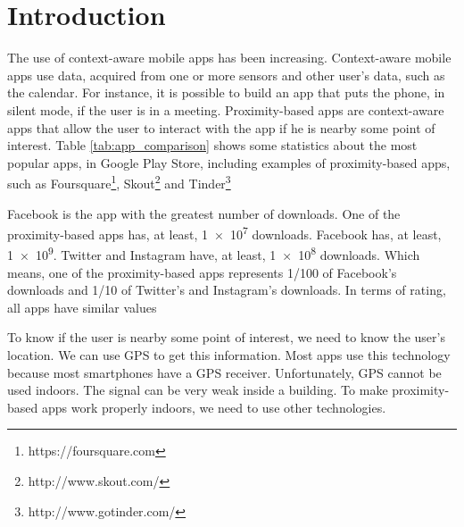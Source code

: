 
%
%

\section{Introduction}
\label{sec:introduction}


The use of context-aware mobile apps has been increasing.
Context-aware mobile apps use data, acquired
from one or more sensors and other user's data, 
such as the calendar. For instance, it is possible to
build an app that puts the phone, in silent mode, if the
user is in a meeting. Proximity-based apps are
context-aware apps that allow the user to interact
with the app if he is nearby some point of interest.
Table \ref{tab:app_comparison} shows some statistics
about the most popular apps, in Google Play Store,
including examples of proximity-based apps,
such as Foursquare\footnote{https://foursquare.com},
Skout\footnote{http://www.skout.com/} and
Tinder\footnote{http://www.gotinder.com/}



Facebook is the app with the
greatest number of downloads. One of the 
proximity-based apps has, at least, \num{1e7} downloads.
Facebook has, at least, \num{1e9}. Twitter and Instagram
have, at least, \num{1e8} downloads. Which means, one of
the proximity-based apps represents
1/100 of Facebook's downloads and 1/10 of Twitter's
and Instagram's downloads. In terms of rating, all apps
have similar values

To know if the user is nearby some point of interest,
we need to know the user's location. We can use GPS to
get this information. Most apps use this technology because
most smartphones have a GPS receiver. 
Unfortunately, GPS cannot be used indoors. The signal can
be very weak inside a building. To make proximity-based
apps work properly indoors, we need to use other 
technologies.
